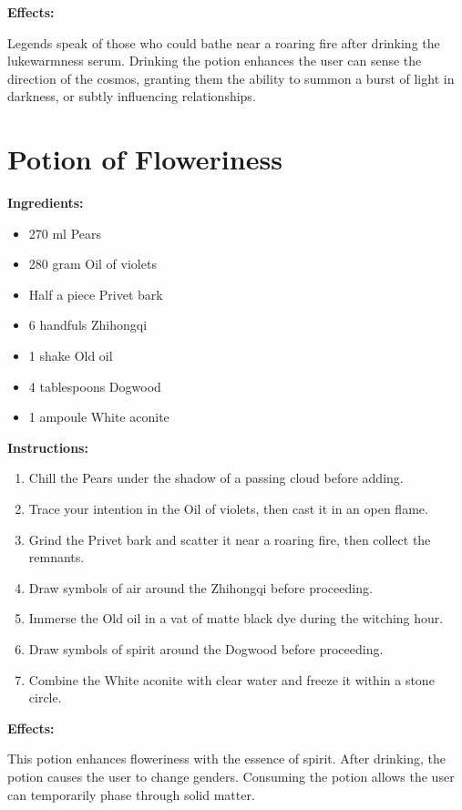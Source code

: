 \documentclass{article}
\begin{document}
\textbf{Effects:}

Legends speak of those who could bathe near a roaring fire after drinking the lukewarmness serum. Drinking the potion enhances the user can sense the direction of the cosmos, granting them the ability to summon a burst of light in darkness, or subtly influencing relationships.

\newpage
\section*{Potion of Floweriness}

\textbf{Ingredients:}

\begin{itemize}
  \item 270 ml Pears
  \item 280 gram Oil of violets
  \item Half a piece Privet bark
  \item 6 handfuls Zhihongqi
  \item 1 shake Old oil
  \item 4 tablespoons Dogwood
  \item 1 ampoule White aconite
\end{itemize}

\textbf{Instructions:}

\begin{enumerate}
  \item Chill the Pears under the shadow of a passing cloud before adding.
  \item Trace your intention in the Oil of violets, then cast it in an open flame.
  \item Grind the Privet bark and scatter it near a roaring fire, then collect the remnants.
  \item Draw symbols of air around the Zhihongqi before proceeding.
  \item Immerse the Old oil in a vat of matte black dye during the witching hour.
  \item Draw symbols of spirit around the Dogwood before proceeding.
  \item Combine the White aconite with clear water and freeze it within a stone circle.
\end{enumerate}

\textbf{Effects:}

This potion enhances floweriness with the essence of spirit. After drinking, the potion causes the user to change genders. Consuming the potion allows the user can temporarily phase through solid matter.
\end{document}
